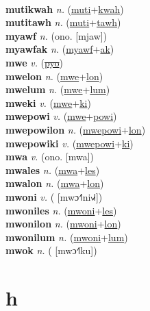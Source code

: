 \label{mutiki} \\
\textbf{mutikwah} \textit{n.} (\hyperref[muti]{muti}+\hyperref[kwah]{kwah})
 \label{mutikwah} \\
\textbf{mutitawh} \textit{n.} (\hyperref[muti]{muti}+\hyperref[tawh]{tawh})
 \label{mutitawh} \\
\textbf{myawf} \textit{n.} (ono. [mjaw])
 \label{myawf} \\
\textbf{myawfak} \textit{n.} (\hyperref[myawf]{myawf}+\hyperref[ak]{ak})
 \label{myawfak} \\
\textbf{mwe} \textit{v.} (\hyperref[pyo]{\sout{pyo}})
 \label{mwe} \\
\textbf{mwelon} \textit{n.} (\hyperref[mwe]{mwe}+\hyperref[lon]{lon})
 \label{mwelon} \\
\textbf{mwelum} \textit{n.} (\hyperref[mwe]{mwe}+\hyperref[lum]{lum})
 \label{mwelum} \\
\textbf{mweki} \textit{v.} (\hyperref[mwe]{mwe}+\hyperref[ki]{ki})
 \label{mweki} \\
\textbf{mwepowi} \textit{v.} (\hyperref[mwe]{mwe}+\hyperref[powi]{powi})
 \label{mwepowi} \\
\textbf{mwepowilon} \textit{n.} (\hyperref[mwepowi]{mwepowi}+\hyperref[lon]{lon})
 \label{mwepowilon} \\
\textbf{mwepowiki} \textit{v.} (\hyperref[mwepowi]{mwepowi}+\hyperref[ki]{ki})
 \label{mwepowiki} \\
\textbf{mwa} \textit{v.} (ono. [mwa])
 \label{mwa} \\
\textbf{mwales} \textit{n.} (\hyperref[mwa]{mwa}+\hyperref[les]{les})
 \label{mwales} \\
\textbf{mwalon} \textit{n.} (\hyperref[mwa]{mwa}+\hyperref[lon]{lon})
 \label{mwalon} \\
\textbf{mwoni} \textit{v.} ( [mwɔ˧˥ni˧˩˧])
 \label{mwoni} \\
\textbf{mwoniles} \textit{n.} (\hyperref[mwoni]{mwoni}+\hyperref[les]{les})
 \label{mwoniles} \\
\textbf{mwonilon} \textit{n.} (\hyperref[mwoni]{mwoni}+\hyperref[lon]{lon})
 \label{mwonilon} \\
\textbf{mwonilum} \textit{n.} (\hyperref[mwoni]{mwoni}+\hyperref[lum]{lum})
 \label{mwonilum} \\
\textbf{mwok} \textit{n.} ( [mwɔ˧˥ku])
 \label{mwok} 

\section{h}

